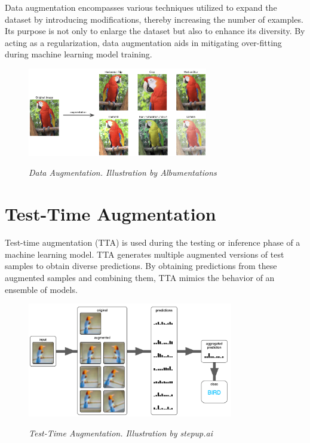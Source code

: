 Data augmentation encompasses various techniques utilized to expand the dataset by introducing modifications, thereby increasing the number of examples. Its purpose is not only to enlarge the dataset but also to enhance its diversity. By acting as a regularization, data augmentation aids in mitigating over-fitting during machine learning model training.

\begin{figure}[H]
\centering
\includegraphics[width=0.7\textwidth]{imatges/preliminaries/augmentation.jpg}
\caption[Data Augmentation]{\textit{Data Augmentation. Illustration by Albumentations}}
{\label{fig:augmentation}}
\end{figure}


\section{Test-Time Augmentation}

Test-time augmentation (TTA) is used during the testing or inference phase of a machine learning model. TTA generates multiple augmented versions of test samples to obtain diverse predictions. By obtaining predictions from these augmented samples and combining them, TTA mimics the behavior of an ensemble of models.

\begin{figure}[H]
\centering
\includegraphics[width=0.8\textwidth]{imatges/preliminaries/tta.png}
\caption[Test-Time Augmentation]{\textit{Test-Time Augmentation. Illustration by stepup.ai}}
{\label{fig:tta}}
\end{figure}

